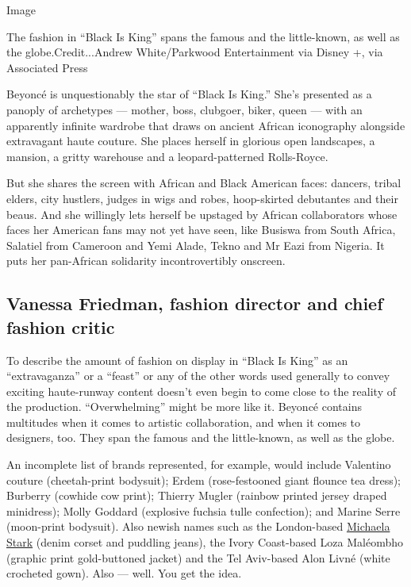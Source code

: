 Image

The fashion in ``Black Is King'' spans the famous and the little-known,
as well as the globe.Credit...Andrew White/Parkwood Entertainment via
Disney +, via Associated Press

Beyoncé is unquestionably the star of ``Black Is King.'' She's presented
as a panoply of archetypes --- mother, boss, clubgoer, biker, queen ---
with an apparently infinite wardrobe that draws on ancient African
iconography alongside extravagant haute couture. She places herself in
glorious open landscapes, a mansion, a gritty warehouse and a
leopard-patterned Rolls-Royce.

But she shares the screen with African and Black American faces:
dancers, tribal elders, city hustlers, judges in wigs and robes,
hoop-skirted debutantes and their beaus. And she willingly lets herself
be upstaged by African collaborators whose faces her American fans may
not yet have seen, like Busiswa from South Africa, Salatiel from
Cameroon and Yemi Alade, Tekno and Mr Eazi from Nigeria. It puts her
pan-African solidarity incontrovertibly onscreen.

\hypertarget{vanessa-friedman-fashion-director-and-chief-fashion-critic}{%
\subsection{Vanessa Friedman, fashion director and chief fashion
critic}\label{vanessa-friedman-fashion-director-and-chief-fashion-critic}}

To describe the amount of fashion on display in ``Black Is King'' as an
``extravaganza'' or a ``feast'' or any of the other words used generally
to convey exciting haute-runway content doesn't even begin to come close
to the reality of the production. ``Overwhelming'' might be more like
it. Beyoncé contains multitudes when it comes to artistic collaboration,
and when it comes to designers, too. They span the famous and the
little-known, as well as the globe.

An incomplete list of brands represented, for example, would include
Valentino couture (cheetah-print bodysuit); Erdem (rose-festooned giant
flounce tea dress); Burberry (cowhide cow print); Thierry Mugler
(rainbow printed jersey draped minidress); Molly Goddard (explosive
fuchsia tulle confection); and Marine Serre (moon-print bodysuit). Also
newish names such as the London-based
\href{https://www.instagram.com/p/CDTR8fsA1Y_/}{Michaela Stark} (denim
corset and puddling jeans), the Ivory Coast-based Loza Maléombho
(graphic print gold-buttoned jacket) and the Tel Aviv-based Alon Livné
(white crocheted gown). Also --- well. You get the idea.

